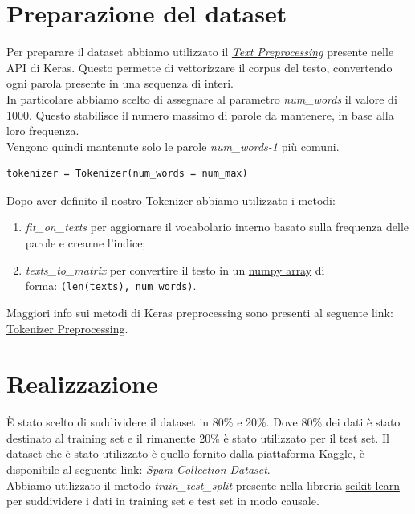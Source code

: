 \section{Preparazione del dataset}
Per preparare il dataset abbiamo utilizzato il \href{https://keras.io/preprocessing/text/#Tokenizer}{\textit{Text Preprocessing}} presente nelle API di Keras. Questo permette di vettorizzare il corpus del testo, convertendo ogni parola presente in una sequenza di interi.\\
In particolare abbiamo scelto di assegnare al parametro \textit{num\_words} il valore di 1000. Questo stabilisce il numero massimo di parole da mantenere, in base alla loro frequenza.\\
Vengono quindi mantenute solo le parole \textit{num\_words-1} più comuni.
\begin{lstlisting}[backgroundcolor = \color{white}]
tokenizer = Tokenizer(num_words = num_max)
\end{lstlisting}
Dopo aver definito il nostro Tokenizer abbiamo utilizzato i metodi: 
\begin{enumerate}
	\item \textit{fit\_on\_texts} per aggiornare il vocabolario interno basato sulla frequenza delle parole e crearne l'indice;
	\item \textit{texts\_to\_matrix} per convertire il testo in un \href{https://docs.scipy.org/doc/numpy/reference/generated/numpy.array.html}{numpy array} di\\ 
	forma: \texttt{(len(texts), num\_words)}.
\end{enumerate}
Maggiori info sui metodi di Keras preprocessing sono presenti al seguente link: \href{http://faroit.com/keras-docs/2.0.2/preprocessing/text/}{Tokenizer Preprocessing}.

\section{Realizzazione}
È stato scelto di suddividere il dataset in 80\% e 20\%. Dove 80\% dei dati è stato destinato al training set e il rimanente 20\% è stato utilizzato per il test set. Il dataset che è stato utilizzato è quello fornito dalla piattaforma \href{https://www.kaggle.com/}{Kaggle}, è disponibile al seguente link: \href{https://www.kaggle.com/uciml/sms-spam-collection-dataset}{\textit{Spam Collection Dataset}}.\\
Abbiamo utilizzato il metodo \textit{train\_test\_split} presente nella libreria \href{https://scikit-learn.org/stable/modules/generated/sklearn.model_selection.train_test_split.html#sklearn-model-selection-train-test-split}{scikit-learn} per suddividere i dati in training set e test set in modo causale.


